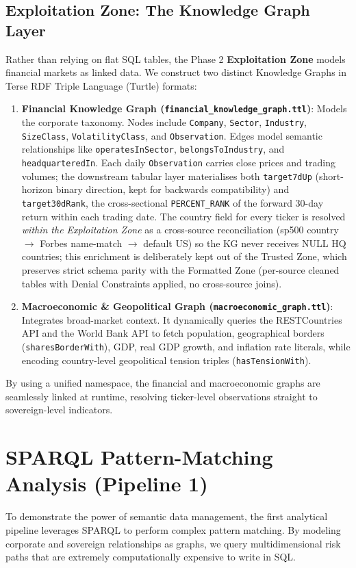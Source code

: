 \documentclass[10pt,journal,compsoc]{IEEEtran}
\begin{document}
\subsection{Exploitation Zone: The Knowledge Graph Layer}
Rather than relying on flat SQL tables, the Phase 2 \textbf{Exploitation Zone} models financial markets as linked data. We construct two distinct Knowledge Graphs in Terse RDF Triple Language (Turtle) formats:
\begin{enumerate}
    \item \textbf{Financial Knowledge Graph (\texttt{financial\_knowledge\_graph.ttl})}: Models the corporate taxonomy. Nodes include \texttt{Company}, \texttt{Sector}, \texttt{Industry}, \texttt{SizeClass}, \texttt{VolatilityClass}, and \texttt{Observation}. Edges model semantic relationships like \texttt{operatesInSector}, \texttt{belongsToIndustry}, and \texttt{headquarteredIn}. Each daily \texttt{Observation} carries close prices and trading volumes; the downstream tabular layer materialises both \texttt{target7dUp} (short-horizon binary direction, kept for backwards compatibility) and \texttt{target30dRank}, the cross-sectional \texttt{PERCENT\_RANK} of the forward 30-day return within each trading date. The country field for every ticker is resolved \emph{within the Exploitation Zone} as a cross-source reconciliation (sp500 country $\rightarrow$ Forbes name-match $\rightarrow$ default US) so the KG never receives NULL HQ countries; this enrichment is deliberately kept out of the Trusted Zone, which preserves strict schema parity with the Formatted Zone (per-source cleaned tables with Denial Constraints applied, no cross-source joins).
    \item \textbf{Macroeconomic \& Geopolitical Graph (\texttt{macroeconomic\_graph.ttl})}: Integrates broad-market context. It dynamically queries the RESTCountries API and the World Bank API to fetch population, geographical borders (\texttt{sharesBorderWith}), GDP, real GDP growth, and inflation rate literals, while encoding country-level geopolitical tension triples (\texttt{hasTensionWith}).
\end{enumerate}

By using a unified namespace, the financial and macroeconomic graphs are seamlessly linked at runtime, resolving ticker-level observations straight to sovereign-level indicators.

\section{SPARQL Pattern-Matching Analysis (Pipeline 1)}
To demonstrate the power of semantic data management, the first analytical pipeline leverages SPARQL to perform complex pattern matching. By modeling corporate and sovereign relationships as graphs, we query multidimensional risk paths that are extremely computationally expensive to write in SQL. 
\end{document}
